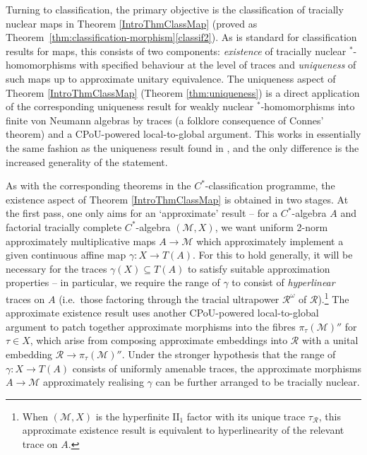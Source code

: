 \documentclass[a4paper,11pt]{amsart}
\theoremstyle{definition}
\numberwithin{equation}{section}
\numberwithin{theorem}{section}
\begin{document}
Turning to classification, the primary objective is the classification of tracially nuclear maps in Theorem \ref{IntroThmClassMap} (proved as Theorem~\ref{thm:classification-morphism}\ref{classif2}). As is standard for classification results for maps, this consists of two components: \emph{existence} of tracially nuclear $^*$-homomorphisms with specified behaviour at the level of traces and \emph{uniqueness} of such maps up to approximate unitary equivalence. The uniqueness aspect of Theorem \ref{IntroThmClassMap} (Theorem \ref{thm:uniqueness}) is a direct application of the corresponding uniqueness result for weakly nuclear $^*$-homomorphisms into finite von Neumann algebras by traces (a folklore consequence of Connes' theorem) and a CPoU-powered local-to-global argument.  This works in essentially the same fashion as the uniqueness result found in \cite[Theorem 2.2]{CETW-classification}, and the only difference is the increased generality of the statement.  

As with the corresponding theorems in the $C^*$-classification programme, the existence aspect of Theorem \ref{IntroThmClassMap} is obtained in two stages.  At the first pass, one only aims for an `approximate' result -- for a $C^*$-algebra $A$ and factorial tracially complete $C^*$-algebra $(\mathcal M,X)$, we want uniform 2-norm approximately multiplicative maps $A\rightarrow \mathcal M$ which approximately implement a given continuous affine map $\gamma\colon X\to T(A)$. For this to hold generally, it will be necessary for the traces $\gamma(X)\subseteq T(A)$ to satisfy suitable approximation properties -- in particular, we require the range of $\gamma$ to consist of \emph{hyperlinear} traces on $A$ (i.e.\ those factoring through the tracial ultrapower $\mathcal R^\omega$ of $\mathcal R$).\footnote{When $(\mathcal M, X)$ is the hyperfinite $\mathrm{II}_1$ factor with its unique trace $\tau_\mathcal R$, this approximate existence result is equivalent to hyperlinearity of the relevant trace on $A$.}  The approximate existence result uses another CPoU-powered local-to-global argument to patch together approximate morphisms into the fibres $\pi_\tau(\mathcal M)''$ for $\tau \in X$, which arise from composing approximate embeddings into $\mathcal R$ with a unital embedding $\mathcal R \rightarrow \pi_\tau(\mathcal M)''$.  Under the stronger hypothesis that the range of $\gamma \colon X \rightarrow T(A)$ consists of uniformly amenable traces, the approximate morphisms $A \rightarrow \mathcal M$ approximately realising $\gamma$ can be further arranged to be tracially nuclear.
\end{document}
